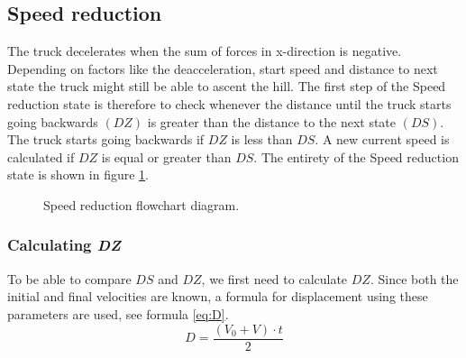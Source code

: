 \documentclass[noprint]{uit-thesis}
\begin{document}
\subsection{Speed reduction}
The truck decelerates when the sum of forces in x-direction is negative. Depending on factors like the deacceleration, start speed and distance to next state the truck might still be able to ascent the hill. The first step of the Speed reduction state is therefore to check whenever the distance until the truck starts going backwards $(DZ)$ is greater than the distance to the next state $(DS)$. The truck starts going backwards if $DZ$ is less than $DS$. A new current speed is calculated if $DZ$ is equal or greater than $DS$. The entirety of the Speed reduction state is shown in figure \ref{fig:SpeedReductionDiagram}.

\begin{figure} [H]
\centering

\caption{Speed reduction flowchart diagram.}
\label{fig:SpeedReductionDiagram}
\end{figure}

\subsubsection{Calculating \textbf{\textit{DZ}}}
To be able to compare $DS$ and $DZ$, we first need to calculate $DZ$. Since both the initial and final velocities are known, a formula for displacement using these parameters are used, see formula \ref{eq:D}.
\begin{equation}
\label{eq:D}
D = \frac{(V_0 + V) \cdot t}{2}
\end{equation}
\end{document}
